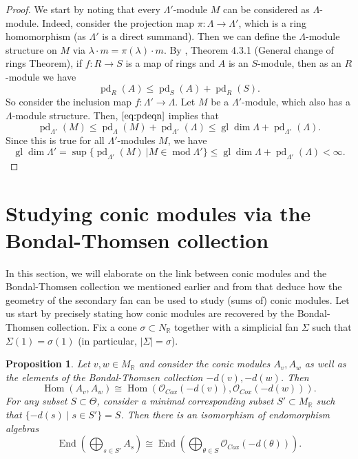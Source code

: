 \documentclass[reqno, 12pt]{amsart}
\newtheorem{proposition}[theorem]{Proposition}
\theoremstyle{definition}
\numberwithin{equation}{section}
\newcommand{\Hom}{\operatorname{Hom}}
\newcommand{\R}{\mathbb{R}}
\def\O{\mathcal{O}}
\newcommand{\End}{\operatorname{End}}
\newcommand{\gldim}{\operatorname{gl}\dim}
\begin{document}
\begin{proof}
We start by noting that every $\Lambda'$-module $M$ can be considered as $\Lambda$-module. Indeed, consider the projection map $\pi:\Lambda\rightarrow\Lambda'$, which is a ring homomorphism (as $\Lambda'$ is a direct summand). Then we can define the $\Lambda$-module structure on $M$ via $\lambda\cdot m=\pi(\lambda)\cdot m$.
By \cite{WeibelBook}, Theorem 4.3.1 (General change of rings Theorem), if $f:R\rightarrow S$ is a map of rings and $A$ is an $S$-module, then as an $R$-module we have
\begin{equation}\label{eq:pdeqn}
   \operatorname{pd}_{R}(A)\le \operatorname{pd}_S(A) + \operatorname{pd}_R(S).
\end{equation}
So consider the inclusion map $f:\Lambda'\rightarrow \Lambda$. Let $M$ be a $\Lambda'$-module, which also has a $\Lambda$-module structure. 
Then, $\eqref{eq:pdeqn}$ implies that
\[
\operatorname{pd}_{\Lambda'}(M)\le \operatorname{pd}_{\Lambda}(M)+\operatorname{pd}_{\Lambda'}(\Lambda)\le \gldim \Lambda+\operatorname{pd}_{\Lambda'}(\Lambda).
\]
Since this is true for all $\Lambda'$-modules $M$, we have \[\gldim\Lambda'=\sup\{\operatorname{pd}_{\Lambda'}(M)\ \vert M\in\operatorname{mod}\Lambda'\}\le \gldim\Lambda+\operatorname{pd}_{\Lambda'}(\Lambda)<\infty.\] 
\end{proof}


\section{Studying conic modules via the Bondal-Thomsen collection}\label{sec:Link}


In this section, we will elaborate on the link between conic modules and the Bondal-Thomsen collection we mentioned earlier and from that deduce how the geometry of the secondary fan can be used to study (sums of) conic modules. Let us start by precisely stating how conic modules are recovered by the Bondal-Thomsen collection. Fix a cone $\sigma\subset N_\R$ together with a simplicial fan $\Sigma$ such that $\Sigma(1)=\sigma(1)$ (in particular, $|\Sigma|=\sigma$). 

\begin{proposition}
    \label{Prop:BTisConic}
    Let $v,w\in M_\R$ and consider the conic modules $A_v, A_w$ as well as the elements of the Bondal-Thomsen collection $-d(v),-d(w)$. Then\[
    \Hom(A_v,A_w)\cong\Hom(\O_{Cox}(-d(v)),\O_{Cox}(-d(w))).
    \]
    For any subset $S\subset \Theta$, consider a minimal corresponding subset $S'\subset M_\R$ such that $\{-d(s)\mid s\in S'\}=S$. Then there is an isomorphism of endomorphism algebras \[\End(\bigoplus_{s\in S'} A_{s})\cong \End(\bigoplus_{\theta\in S}\O_{Cox}(-d(\theta))).\]
\end{proposition}
\end{document}
